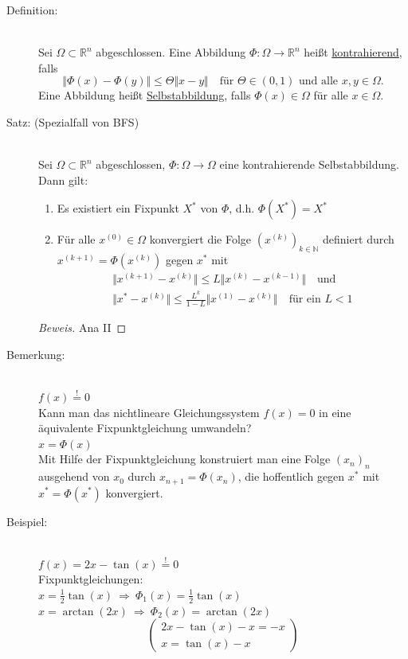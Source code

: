 \documentclass[12pt]{article}
\theoremstyle{break}
\begin{document}
\begin{description}
  \item[Definition:] \leavevmode \\
  Sei $\Omega \subset \mathbb{R}^n$ abgeschlossen. Eine Abbildung $\Phi: \Omega \rightarrow \mathbb{R}^n$ heißt \underline{kontrahierend}, falls
  $$ \Vert \Phi(x) - \Phi(y) \Vert \leq \Theta \Vert x-y \Vert \quad \text{für } \Theta \in (0,1) \text{ und alle } x, y \in \Omega.$$
  Eine Abbildung heißt \underline{Selbstabbildung}, falls $\Phi(x) \in \Omega$ für alle $x \in \Omega$.
  
  \item[Satz: (Spezialfall von BFS)] \leavevmode \\
  Sei $\Omega \subset \mathbb{R}^n$ abgeschlossen, $\Phi: \Omega \rightarrow \Omega$ eine kontrahierende Selbstabbildung. Dann gilt:
  \renewcommand{\labelenumi}{\roman{enumi})}
  \begin{enumerate}
    \item Es existiert ein Fixpunkt $X^*$ von $\Phi$, d.h. $\Phi(X^*) = X^*$
    \item Für alle $x^{(0)} \in \Omega$ konvergiert die Folge $(x^{(k)})_{k \in \mathbb{N}}$ definiert durch $x^{(k+1)} = \Phi(x^{(k)})$ gegen $x^*$ mit 
    \begin{align*}
      &\Vert x^{(k+1)} - x^{(k)} \Vert \leq L \Vert x^{(k)} - x^{(k-1)} \Vert \quad \text{und} &\\
      &\Vert x^* - x^{(k)} \Vert \leq \frac{L^k}{1-L} \Vert x^{(1)} - x^{(k)} \Vert \quad \text{für ein } L < 1
    \end{align*}
  \end{enumerate}
  \begin{proof}[Beweis] 
  Ana II
  \end{proof}
  
  \item[Bemerkung:] \leavevmode \\
  $f(x) \overset{!}{=} 0$ \\
  Kann man das nichtlineare Gleichungssystem $f(x) = 0$ in eine äquivalente Fixpunktgleichung umwandeln?\\
  $x = \Phi(x)$ \\
  Mit Hilfe der Fixpunktgleichung konstruiert man eine Folge $(x_n)_n$ ausgehend von $x_0$ durch $x_{n+1} = \Phi(x_n)$, die hoffentlich gegen $x^*$ mit $x^* = \Phi(x^*)$ konvergiert.
  
  \item[Beispiel:] \leavevmode \\
  $f(x) = 2x - \tan(x) \overset{!}{=} 0$ \\
  Fixpunktgleichungen:\\
  $x = \frac{1}{2} \tan(x) \medspace \Rightarrow \medspace \Phi_1(x) = \frac{1}{2} \tan(x)$ \\
  $x = \arctan(2x) \medspace \Rightarrow \medspace \Phi_2(x) = \arctan(2x)$ 
  $$\left( \begin{array}{l} 2x - \tan(x) - x = -x \\ x = \tan(x) -x \end{array} \right)$$
\end{description}
\end{document}

